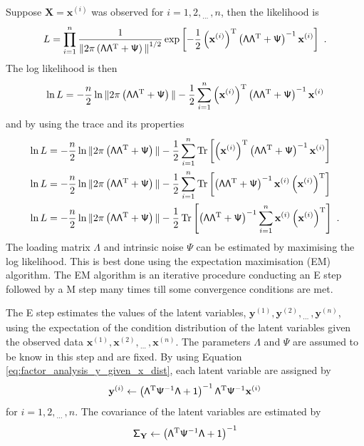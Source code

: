 \documentclass[12pt]{report}
\DeclareMathOperator{\trace}{Tr}
\newcommand{\T}{^\textup{T}}
\newcommand{\dotdotdot}{_{\phantom{.}\cdots}}
\newcommand{\vect}[1]{\mathbf{#1}}
\newcommand{\matr}[1]{\mathsf{#1}}
\begin{document}
Suppose $\vect{X}=\vect{x}^{(i)}$ was observed for $i=1,2,\dotdotdot,n$, then the likelihood is
\begin{equation}
L=\prod_{i=1}^n\frac{1}{{\|2\pi\left(\matr{\Lambda}\matr{\Lambda}\T+\matr{\Psi}\right)\|}^{1/2}}
\exp\left[-\frac{1}{2}\left(\vect{x}^{(i)}\right)\T\left(\matr{\Lambda}\matr{\Lambda}\T+\matr{\Psi}\right)^{-1}\vect{x}^{(i)}\right] \ .
\end{equation}
The log likelihood is then
\begin{equation*}
\ln{L}=-\frac{n}{2}\ln{\|2\pi\left(\matr{\Lambda}\matr{\Lambda}\T+\matr{\Psi}\right)\|}-\frac{1}{2}\sum_{i=1}^{n}\left(\vect{x}^{(i)}\right)\T\left(\matr{\Lambda}\matr{\Lambda}\T+\matr{\Psi}\right)^{-1}\vect{x}^{(i)}
\end{equation*}
and by using the trace and its properties
\begin{align}
\ln{L}&=-\frac{n}{2}\ln{\|2\pi\left(\matr{\Lambda}\matr{\Lambda}\T+\matr{\Psi}\right)\|}-\frac{1}{2}\sum_{i=1}^{n}\trace\left[\left(\vect{x}^{(i)}\right)\T\left(\matr{\Lambda}\matr{\Lambda}\T+\matr{\Psi}\right)^{-1}\vect{x}^{(i)}\right]
\nonumber \\
\ln{L}&=-\frac{n}{2}\ln{\|2\pi\left(\matr{\Lambda}\matr{\Lambda}\T+\matr{\Psi}\right)\|}-\frac{1}{2}\sum_{i=1}^{n}\trace\left[\left(\matr{\Lambda}\matr{\Lambda}\T+\matr{\Psi}\right)^{-1}\vect{x}^{(i)}\left(\vect{x}^{(i)}\right)\T\right]
\nonumber \\
\ln{L}&=-\frac{n}{2}\ln{\|2\pi\left(\matr{\Lambda}\matr{\Lambda}\T+\matr{\Psi}\right)\|}-\frac{1}{2}\trace\left[\left(\matr{\Lambda}\matr{\Lambda}\T+\matr{\Psi}\right)^{-1}\sum_{i=1}^{n}\vect{x}^{(i)}\left(\vect{x}^{(i)}\right)\T\right] \ .
\end{align}
The loading matrix $\matr{\Lambda}$ and intrinsic noise $\matr{\Psi}$ can be estimated by maximising the log likelihood. This is best done using the expectation maximisation (EM) algorithm. The EM algorithm is an iterative procedure conducting an E step followed by a M step many times till some convergence conditions are met.

The E step estimates the values of the latent variables, $\vect{y}^{(1)},\vect{y}^{(2)},\dotdotdot,\vect{y}^{(n)}$, using the expectation of the condition distribution of the latent variables given the observed data $\vect{x}^{(1)},\vect{x}^{(2)},\dotdotdot,\vect{x}^{(n)}$. The parameters $\matr{\Lambda}$ and $\matr{\Psi}$ are assumed to be know in this step and are fixed. By using Equation \eqref{eq:factor_analysis_y_given_x_dist}, each latent variable are assigned by
\begin{equation}
\vect{y}^{(i)} \leftarrow \left(\matr{\Lambda}\T\matr{\Psi}^{-1}\matr{\Lambda}+\matr{1}\right)^{-1}\matr{\Lambda}\T\matr{\Psi}^{-1}\vect{x}^{(i)}
\end{equation}
for $i=1,2,\dotdotdot,n$. The covariance of the latent variables are estimated by
\begin{equation}
\matr{\Sigma}_{\vect{Y}} \leftarrow \left(\matr{\Lambda}\T\matr{\Psi}^{-1}\matr{\Lambda}+\matr{1}\right)^{-1}
\end{equation}
\end{document}
